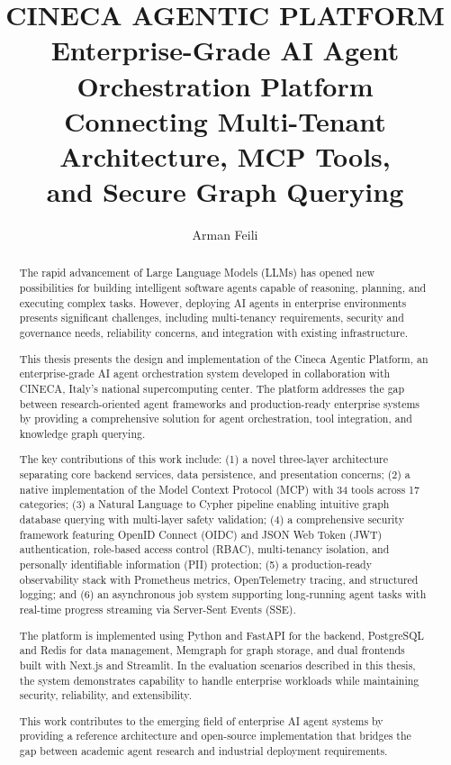 \documentclass[a4paper,twoside]{sapthesis}
\title{CINECA AGENTIC PLATFORM\\
       Enterprise-Grade AI Agent Orchestration Platform\\
       Connecting Multi-Tenant Architecture, MCP Tools,\\
       and Secure Graph Querying}
\author{Arman Feili}
\newcommand{\ToolCount}{34}
\begin{document}
\frontmatter

\maketitle

\begin{abstract}
    The rapid advancement of Large Language Models (LLMs) has opened new possibilities for building intelligent software agents capable of reasoning, planning, and executing complex tasks. However, deploying AI agents in enterprise environments presents significant challenges, including multi-tenancy requirements, security and governance needs, reliability concerns, and integration with existing infrastructure.
    
    This thesis presents the design and implementation of the Cineca Agentic Platform, an enterprise-grade AI agent orchestration system developed in collaboration with CINECA, Italy's national supercomputing center. The platform addresses the gap between research-oriented agent frameworks and production-ready enterprise systems by providing a comprehensive solution for agent orchestration, tool integration, and knowledge graph querying.
    
    The key contributions of this work include: (1) a novel three-layer architecture separating core backend services, data persistence, and presentation concerns; (2) a native implementation of the Model Context Protocol (MCP) with \ToolCount{} tools across 17 categories; (3) a Natural Language to Cypher pipeline enabling intuitive graph database querying with multi-layer safety validation; (4) a comprehensive security framework featuring OpenID Connect (OIDC) and JSON Web Token (JWT) authentication, role-based access control (RBAC), multi-tenancy isolation, and personally identifiable information (PII) protection; (5) a production-ready observability stack with Prometheus metrics, OpenTelemetry tracing, and structured logging; and (6) an asynchronous job system supporting long-running agent tasks with real-time progress streaming via Server-Sent Events (SSE).
    
    The platform is implemented using Python and FastAPI for the backend, PostgreSQL and Redis for data management, Memgraph for graph storage, and dual frontends built with Next.js and Streamlit. In the evaluation scenarios described in this thesis, the system demonstrates capability to handle enterprise workloads while maintaining security, reliability, and extensibility.
    
    This work contributes to the emerging field of enterprise AI agent systems by providing a reference architecture and open-source implementation that bridges the gap between academic agent research and industrial deployment requirements.
\end{abstract}
\end{document}
